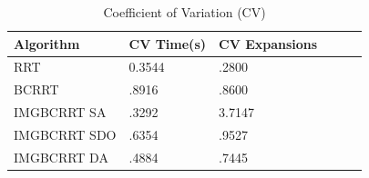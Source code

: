 \documentclass{article}
\begin{document}
\begin{table}[h]
  \caption{Coefficient of Variation (CV)}
  \label{CV}
  \centering
  \begin{tabular}{llllll}
    \cmidrule(r){1-3}
   Algorithm  & CV Time(s) &  CV Expansions\\
    \midrule
    RRT & 0.3544 & .2800\\
    BCRRT & .8916 & .8600\\
    IMGBCRRT SA & .3292 & 3.7147\\
     IMGBCRRT SDO & .6354 & .9527\\
     IMGBCRRT DA  & .4884 & .7445\\
    \bottomrule
  \end{tabular}
\end{table}














\end{document}
